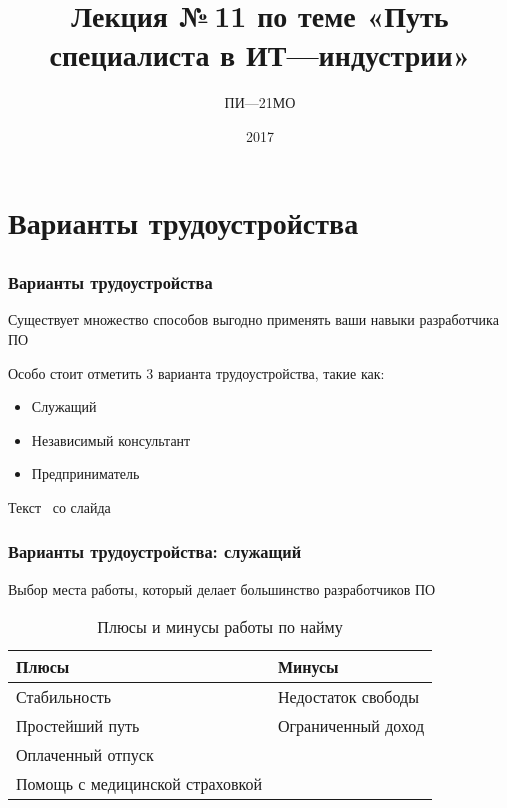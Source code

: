 \documentclass{../industrial-development}
\title{ Лекция №\,11 по теме «Путь специалиста в ИТ---индустрии»}
\author{ПИ---21МО }
\date{2017 }
\begin{document}
\begin{frame}
  \titlepage
\end{frame}

\section{Варианты трудоустройства }

\subsection{}

\begin{frame} \frametitle{Варианты трудоустройства}
  \begin{block}{}
  Существует множество способов выгодно применять ваши навыки разработчика ПО 
  \end{block}

  \bigskip
Особо стоит отметить 3 варианта трудоустройства, такие как:
  
  \begin{itemize}
  \item Служащий
  \item Независимый консультант
  \item Предприниматель
  \end{itemize}
\end{frame}

\lecturenotes

Текст~\cite[с.~62--67]{Sonmez} со слайда

\begin{frame} \frametitle{Варианты трудоустройства: служащий}
  \begin{block}{}
    Выбор места работы, который делает большинство разработчиков ПО 
  \end{block}
  
\begin{table}[H]
\caption{\label{tab:canonsummary} Плюсы и минусы работы по найму}
\begin{center}
\begin{tabular}{|l|l|}
\hline
\textbf{Плюсы} & \textbf{Минусы} \\
\hline
Стабильность &  Недостаток свободы \\
\hline
Простейший путь  & Ограниченный доход \\
\hline
Оплаченный отпуск & \\
\hline
Помощь с медицинской страховкой & \\
\hline
\end{tabular}
\end{center}
\end{table} 

\end{frame}
\end{document}
